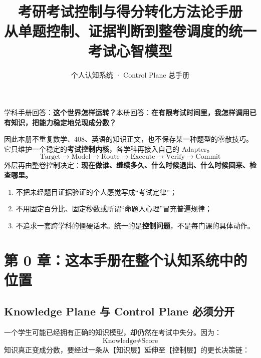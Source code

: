 \documentclass[11pt,a4paper]{ctexart}
\title{\vspace{-1.2cm}\textbf{考研考试控制与得分转化方法论手册}\\[0.35em]
\large 从单题控制、证据判断到整卷调度的统一考试心智模型}
\author{个人认知系统 · Control Plane 总手册}
\date{}
\newcommand{\kw}[1]{\textbf{#1}}
\begin{document}
\maketitle

\begin{corebox}[这本手册只解决一个问题]
学科手册回答：\kw{这个世界怎样运转？}\quad 本册回答：\kw{在有限考试时间里，我怎样调用已有知识，把能力稳定地兑现成分数？}

因此本册不重复数学、408、英语的知识正文，也不保存某一种题型的零散技巧。它只维护一个稳定的\kw{考试控制内核}，各学科再接入自己的 Adapter。
\[
\boxed{
\text{Target}
\rightarrow
\text{Model}
\rightarrow
\text{Route}
\rightarrow
\text{Execute}
\rightarrow
\text{Verify}
\rightarrow
\text{Commit}
}
\]
外层再由整卷控制决定：\kw{现在做谁、继续多久、什么时候退出、什么时候回来、检查哪里。}
\end{corebox}

\begin{warn}[本册不做三件事]
\begin{enumerate}
  \item 不把未经题目证据验证的个人感觉写成“考试定律”；
  \item 不用固定百分比、固定秒数或所谓“命题人心理”冒充普遍规律；
  \item 不追求一套跨学科的僵硬话术。统一的是\kw{控制问题}，不是每门课的具体动作。
\end{enumerate}
\end{warn}

\tableofcontents
\newpage

\section{第 0 章：这本手册在整个认知系统中的位置}

\subsection{Knowledge Plane 与 Control Plane 必须分开}
一个学生可能已经拥有正确的知识模型，却仍然在考试中失分。因为：
\[
\boxed{
\text{Knowledge}
\neq
\text{Score}
}
\]
知识真正变成分数，要经过一条从【知识层】延伸至【控制层】的更长决策链：
\end{document}
